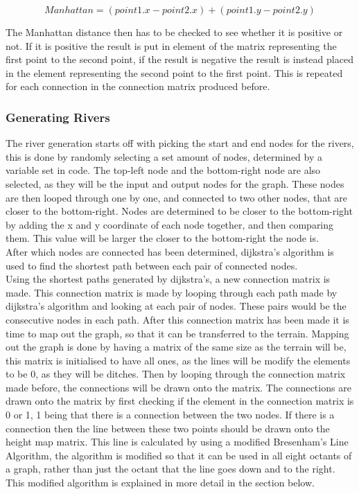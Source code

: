 $$Manhattan = (point1.x - point2.x) + (point1.y - point2.y)$$
	
	The Manhattan distance then has to be checked to see whether it is positive or not. If it is positive the result is put in element of the matrix representing the first point to the second point, if the result is negative the result is instead placed in the element representing the second point to the first point. This is repeated for each connection in the connection matrix produced before.

\subsubsection{Generating Rivers}
	The river generation starts off with picking the start and end nodes for the rivers, this is done by randomly selecting a set amount of nodes, determined by a variable set in code. The top-left node and the bottom-right node are also selected, as they will be the input and output nodes for the graph. These nodes are then looped through one by one, and connected to two other nodes, that are closer to the bottom-right. Nodes are determined to be closer to the bottom-right by adding the x and y coordinate of each node together, and then comparing them. This value will be larger the closer to the bottom-right the node is.\\

	After which nodes are connected has been determined, dijkstra's algorithm is used to find the shortest path between each pair of connected nodes.\\


	Using the shortest paths generated by dijkstra's, a new connection matrix is made. This connection matrix is made by looping through each path made by dijkstra's algorithm and looking at each pair of nodes. These pairs would be the consecutive nodes in each path. After this connection matrix has been made it is time to map out the graph, so that it can be transferred to the terrain. Mapping out the graph is done by having a matrix of the same size as the terrain will be, this matrix is initialised to have all ones, as the lines will be modify the elements to be 0, as they will be ditches. Then by looping through the connection matrix made before, the connections will be drawn onto the matrix. The connections are drawn onto the matrix by first checking if the element in the connection matrix is 0 or 1, 1 being that there is a connection between the two nodes. If there is a connection then the line between these two points should be drawn onto the height map matrix. This line is calculated by using a modified Bresenham's Line Algorithm, the algorithm is modified so that it can be used in all eight octants of a graph, rather than just the octant that the line goes down and to the right. This modified algorithm is explained in more detail in the section below.

